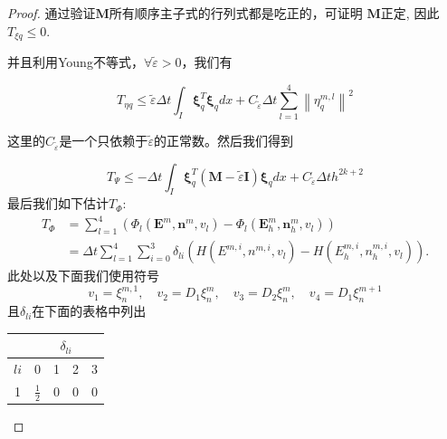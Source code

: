 \begin{proof}
    通过验证$\boldsymbol{M}$所有顺序主子式的行列式都是吃正的，可证明 $\boldsymbol{M}$正定, 因此 $T_{\xi q} \leq 0$.

    并且利用Young不等式，$\forall \tilde{\varepsilon}>0$，我们有

    \begin{equation*}
        T_{\eta q} \leq \tilde{\varepsilon} \Delta t \int_{I} \boldsymbol{\xi}_{q}^{T} \boldsymbol{\xi}_{q} d x+C_{\tilde{\varepsilon}} \Delta t \sum_{l=1}^{4}\left\|\eta_{q}^{m, l}\right\|^{2}
    \end{equation*}

    这里的$C_{\tilde{\varepsilon}}$是一个只依赖于$\tilde{\varepsilon}$的正常数。然后我们得到

    \begin{equation}
        T_{\Psi} \leq-\Delta t \int_{I} \boldsymbol{\xi}_{q}^{T}(\boldsymbol{M}-\tilde{\varepsilon} \boldsymbol{I}) \boldsymbol{\xi}_{q} d x+C_{\tilde{\varepsilon}} \Delta t h^{2 k+2}
    \end{equation}
    最后我们如下估计$T_{\Phi}$:
    $$
        \begin{aligned}
            T_{\Phi} & =\sum_{l=1}^{4}\left(\Phi_{l}\left(\boldsymbol{E}^{m}, \boldsymbol{n}^{m}, v_{l}\right)-\Phi_{l}\left(\boldsymbol{E}_{h}^{m}, \boldsymbol{n}_{h}^{m}, v_{l}\right)\right) \\
                     & =\Delta t \sum_{l=1}^{4} \sum_{i=0}^{3} \delta_{l i}\left(H\left(E^{m, i}, n^{m, i}, v_{l}\right)-H\left(E_{h}^{m, i}, n_{h}^{m, i}, v_{l}\right)\right) .
        \end{aligned}
    $$
    此处以及下面我们使用符号
    \begin{equation*}
        v_{1}=\xi_{n}^{m, 1}, \quad v_{2}=D_{1} \xi_{n}^{m}, \quad v_{3}=D_{2} \xi_{n}^{m}, \quad v_{4}=D_{1} \xi_{n}^{m+1}
    \end{equation*}
    且$\delta_{l i}$在下面的表格中列出
    \begin{center}
        \begin{tabular}{|c|c|c|c|c|}
            \hline
                  & \multicolumn{4}{|c|}{$\delta_{l i}$}                                                     \\
            \hline
            $l i$ & 0                                    & 1                & 2             & 3              \\
            \hline
            1     & $\frac{1}{2}$                        & 0                & 0             & 0              \\

\end{tabular}
\end{center}
\end{proof}
